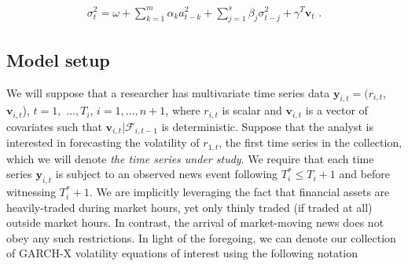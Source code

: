 \documentclass[11pt,3p,review,authoryear]{elsarticle}
\newcommand{\y}{\textbf{y}}
\newcommand{\x}{\textbf{v}}
\theoremstyle{definition}
\begin{document}
\begin{align}
\sigma_{t}^{2} = \omega+ \sum^{m}_{k=1}\alpha_{k}a^{2}_{t-k} + \sum_{j=1}^{s}\beta_{j}\sigma_{t-j}^{2} + \gamma^{T}\x_{t} \text{ .}\label{GARCH-X}
\end{align}


\subsection{Model setup}
\label{modelsetup}
We will suppose that a researcher has multivariate time series data $\y_{i,t} = (r_{i,t}$, $\x_{i,t}$), $t = 1,$ $\ldots,  T_i$, $i = 1, \ldots, n+1$, where $r_{i,t}$ is scalar and $\x_{i,t}$ is a vector of covariates such that $\x_{i,t}|\mathcal{F}_{i,t-1}$ is deterministic.  Suppose that the analyst is interested in forecasting the volatility of $r_{1,t}$, the first time series in the collection, which we will denote \textit{the time series under study}.  We require that each time series $\y_{i,t}$ is subject to an observed news event following $T^*_i \leq T_{i} + 1$ and before witnessing $T^*_i+1$.  We are implicitly leveraging the fact that financial assets are heavily-traded during market hours, yet only thinly traded (if traded at all) outside market hours.  In contrast, the arrival of market-moving news does not obey any such restrictions.  In light of the foregoing, we can denote our collection of GARCH-X volatility equations of interest using the following notation
\end{document}
